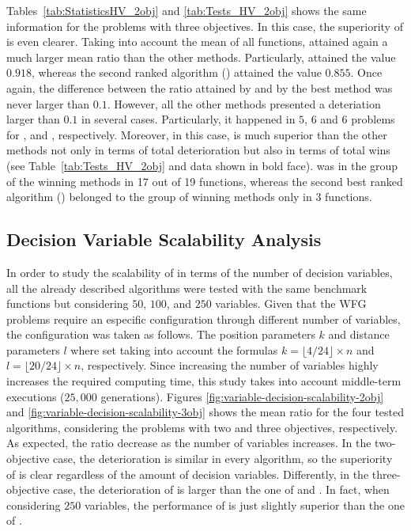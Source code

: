 Tables~\ref{tab:StatisticsHV_2obj} and \ref{tab:Tests_HV_2obj} shows the same information for the problems with three objectives.
%
In this case, the superiority of \VSDMOEA{} is even clearer.
%
Taking into account the mean of all functions, \VSDMOEA{} attained again a much larger mean \HV{} ratio than the other methods.
%
Particularly, \VSDMOEA{} attained the value $0.918$, whereas the second ranked algorithm (\RMOEA{}) attained the value $0.855$.
%
Once again, the difference between the \HV{} ratio attained by \VSDMOEA{} and by the best method was never larger
than $0.1$.
%
However, all the other methods presented a deteriation larger than $0.1$ in several cases.
%
Particularly, it happened in $5$, $6$ and $6$ problems for \RMOEA{}, \NSGAII{} and \MOEAD{}, respectively.
%
Moreover, in this case, \VSDMOEA{} is much superior than the other methods not only in terms of total deterioration but also
in terms of total wins (see Table~\ref{tab:Tests_HV_2obj} and data shown in bold face).
%
\VSDMOEA{} was in the group of the winning methods in 17 out of 19 functions, whereas the second best ranked algorithm (\RMOEA{})
belonged to the group of winning methods only in 3 functions.

\subsection{Decision Variable Scalability Analysis}

In order to study the scalability of \VSDMOEA{} in terms of the number of decision variables, all the already described algorithms were tested with
the same benchmark functions but considering $50$, $100$, and $250$ variables.
%
Given that the WFG problems require an especific configuration through different number of variables, the configuration was taken as follows.
%
The position parameters $k$ and distance parameters $l$ where set taking into account the formulas $k=\lfloor4/24 \rfloor \times n$ and $l=\lfloor 20/24 \rfloor \times n$, respectively.
%
Since increasing the number of variables highly increases the required computing time, this study takes into account middle-term executions ($25,000$ generations).
%
Figures \ref{fig:variable-decision-scalability-2obj} and \ref{fig:variable-decision-scalability-3obj} shows the mean \HV{} ratio for the four tested algorithms,
considering the problems with two and three objectives, respectively.
%
As expected, the \HV{} ratio decrease as the number of variables increases.
%
In the two-objective case, the deterioration is similar in every algorithm, so the superiority of \VSDMOEA{} is clear regardless of the amount of decision
variables.
%
Differently, in the three-objective case, the deterioration of \VSDMOEA{} is larger than the one of \RMOEA{} and \MOEAD{}.
%
In fact, when considering $250$ variables, the performance of \VSDMOEA{} is just slightly superior than the one of \RMOEA{}.


